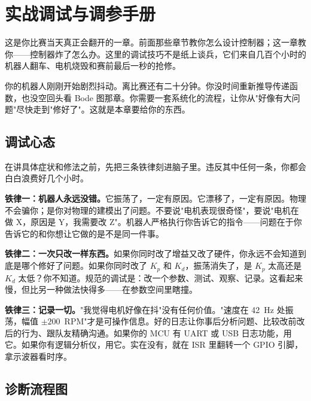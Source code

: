 \section{实战调试与调参手册}

这是你比赛当天真正会翻开的一章。前面那些章节教你怎么设计控制器；这一章教你——控制器炸了怎么办。这里的调试技巧不是纸上谈兵，它们来自几百个小时的机器人翻车、电机烧毁和赛前最后一秒的抢修。

你的机器人刚刚开始剧烈抖动。离比赛还有二十分钟。你没时间重新推导传递函数，也没空回头看 Bode 图那章。你需要一套系统化的流程，让你从"好像有大问题"尽快走到"修好了"。这就是本章要给你的东西。

\subsection{调试心态}

在讲具体症状和修法之前，先把三条铁律刻进脑子里。违反其中任何一条，你都会白白浪费好几个小时。

\textbf{铁律一：机器人永远没错。}它振荡了，一定有原因。它漂移了，一定有原因。物理不会骗你；是你对物理的建模出了问题。不要说"电机表现很奇怪"，要说"电机在做 X，原因是 Y，我需要改 Z"。机器人严格执行你告诉它的指令——问题在于你告诉它的和你想让它做的是不是同一件事。

\textbf{铁律二：一次只改一样东西。}如果你同时改了增益又改了硬件，你永远不会知道到底是哪个修好了问题。如果你同时改了 $K_p$ 和 $K_d$，振荡消失了，是 $K_p$ 太高还是 $K_d$ 太低？你不知道。规范的调试是：改一个参数、测试、观察、记录。这看起来慢，但比另一种做法快得多——在参数空间里瞎撞。

\textbf{铁律三：记录一切。}"我觉得电机好像在抖"没有任何价值。"速度在 42~Hz 处振荡，幅值 $\pm 200$~RPM"才是可操作信息。好的日志让你事后分析问题、比较改前改后的行为、跟队友精确沟通。如果你的 MCU 有 UART 或 USB 日志功能，用它。如果你有逻辑分析仪，用它。实在没有，就在 ISR 里翻转一个 GPIO 引脚，拿示波器看时序。

\subsection{诊断流程图}

